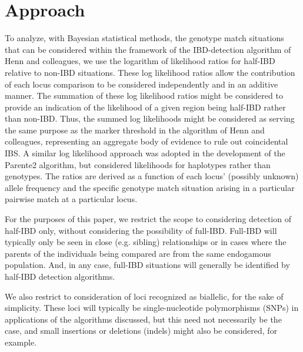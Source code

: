 \documentclass{article}
\begin{document}
\section{Approach}
To analyze, with Bayesian statistical methods, the genotype match situations that can be considered within the framework of the IBD-detection algorithm of Henn and colleagues, we use the logarithm of likelihood ratios for half-IBD relative to non-IBD situations. These log likelihood ratios allow the contribution of each locus comparison to be considered independently and in an additive manner. The summation of these log likelihood ratios might be considered to provide an indication of the likelihood of a given region being half-IBD rather than non-IBD. Thus, the summed log likelihoods might be considered as serving the same purpose as the marker threshold in the algorithm of Henn and colleagues, representing an aggregate body of evidence to rule out coincidental IBS. A similar log likelihood approach was adopted in the development of the Parente2 algorithm, but considered likelihoods for haplotypes rather than genotypes.\citep{Parente2} The ratios are derived as a function of each locus' (possibly unknown) allele frequency and the specific genotype match situation arising in a particular pairwise match at a particular locus.

For the purposes of this paper, we restrict the scope to considering detection of half-IBD only, without considering the possibility of full-IBD. Full-IBD will typically only be seen in close (e.g. sibling) relationships or in cases where the parents of the individuals being compared are from the same endogamous population. And, in any case, full-IBD situations will generally be identified by half-IBD detection algorithms.

We also restrict to consideration of loci recognized as biallelic, for the sake of simplicity. These loci will typically be single-nucleotide polymorphisms (SNPs) in applications of the algorithms discussed, but this need not necessarily be the case, and small insertions or deletions (indels) might also be considered, for example.
\end{document}
